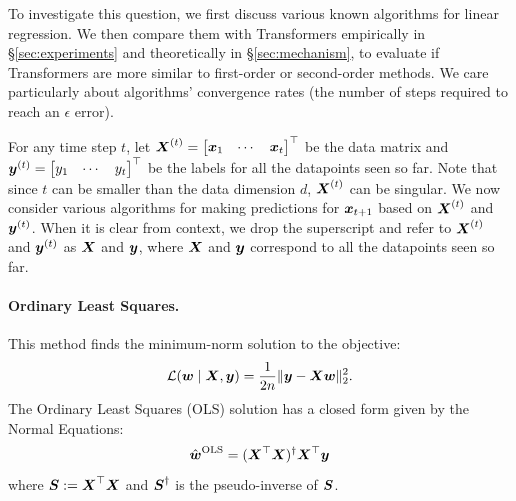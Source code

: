 To investigate this question, we first discuss various known algorithms for linear regression. We then compare them with Transformers empirically in \S\ref{sec:experiments} and theoretically in \S\ref{sec:mechanism}, to evaluate if Transformers are more similar to first-order or second-order methods. We care particularly about algorithms' convergence rates (the number of steps required to reach an $\epsilon$ error).

For any time step $t$, let $\boldsymbol{X}^{(t)} = \begin{bmatrix}
    \boldsymbol{x}_1  & \cdots & \boldsymbol{x}_t
\end{bmatrix}^\top$ be the data matrix and $\boldsymbol{y}^{(t)} = \begin{bmatrix}
    y_1 & \cdots & y_t
\end{bmatrix}^\top$ be the labels for all the datapoints seen so far. Note that since $t$ can be smaller than the data dimension $d$, $\boldsymbol{X}^{(t)}$ can be singular.  We now consider various algorithms for making predictions for $\boldsymbol{x}_{t+1}$ based on $\boldsymbol{X}^{(t)}$ and $\boldsymbol{y}^{(t)}$. When it is clear from context,  we drop the superscript and refer to $\boldsymbol{X}^{(t)}$ and $\boldsymbol{y}^{(t)}$ as $\boldsymbol{X}$ and $\boldsymbol{y}$, where  $\boldsymbol{X}$ and $\boldsymbol{y}$ correspond to all the datapoints seen so far.

\paragraph{Ordinary Least Squares.}
This method finds the minimum-norm solution to the objective:
\begin{equation}
    \mathcal L(\boldsymbol{w} \mid \boldsymbol{X}, \boldsymbol{y}) = \frac{1}{2n}\|\boldsymbol{y} - \boldsymbol{X} \boldsymbol{w} \|_2^2.
    \label{eqn:obj}
\end{equation}
The Ordinary Least Squares (OLS) solution has a closed form given by the Normal Equations:\begin{equation}
    \hat{\boldsymbol{w}}^\mathrm{OLS} = (\boldsymbol{X}^\top \boldsymbol{X})^\dagger \boldsymbol{X}^\top \boldsymbol{y} 
\end{equation}
where $\boldsymbol{S} := \boldsymbol{X}^\top \boldsymbol{X}$  and $\boldsymbol{S}^\dagger$ is the pseudo-inverse \citep{moonre1920pseudo} of $\boldsymbol{S}$.

